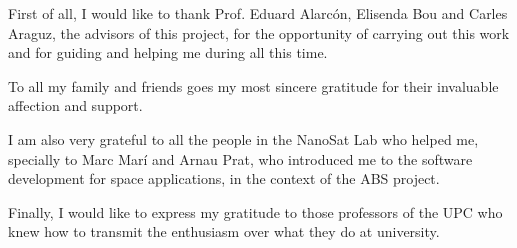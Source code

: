 \documentclass[
10pt, %
english, %
singlespacing, %
parskip, %
headsepline, %
]{MastersDoctoralThesis} %
\begin{document}
\begin{acknowledgements}
\addchaptertocentry{\acknowledgementname} %
\bigskip

First of all, I would like to thank Prof. Eduard Alarc\'on, Elisenda Bou and Carles Araguz, the advisors of this project, for the opportunity of carrying out this work and for guiding and helping me during all this time.

To all my family and friends goes my most sincere gratitude for their invaluable affection and support.

I am also very grateful to all the people in the NanoSat Lab who helped me, specially to Marc Marí and Arnau Prat, who introduced me to the software development for space applications, in the context of the ABS project.

Finally, I would like to express my gratitude to those professors of the UPC who knew how to transmit the enthusiasm over what they do at university.

\end{acknowledgements}

\end{document}
